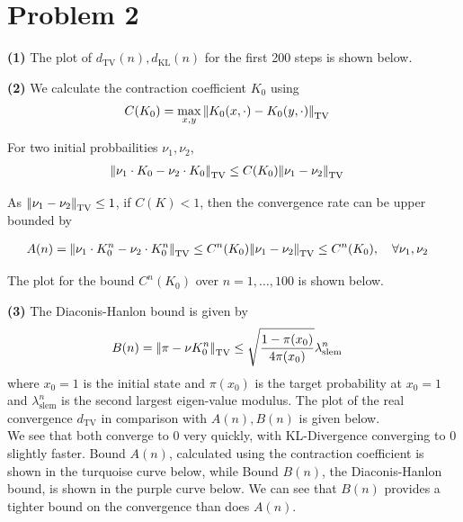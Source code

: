 \documentclass[5pt]{article}
\newcommand{\vertii}[1]{{\left\vert\kern-0.25ex\left\vert #1 
    \right\vert\kern-0.25ex\right\vert}}
\begin{document}
\section{Problem 2}

\textbf{(1)} The plot of $d_{\mathrm{TV}}(n), d_{\mathrm{KL}}(n)$ for the first 200 steps is shown below.

\textbf{(2)} We calculate the contraction coefficient $K_0$ using
\begin{align}
	& C(K_0) = \max_{x, y} \vertii{K_0(x, \cdot) - K_0(y, \cdot)}_{\mathrm{TV}}
\end{align}

For two initial probbailities $\nu_1, \nu_2$,
\begin{align}
	& \vertii{\nu_1 \cdot K_0 - \nu_2 \cdot K_0}_{\mathrm{TV}} \leq C(K_0) \vertii{\nu_1 - \nu_2}_{\mathrm{TV}}
\end{align}

As $\vertii{\nu_1 - \nu_2}_{\mathrm{TV}} \leq 1$, if $C(K) < 1$, then the convergence rate can be upper bounded by

\begin{align}
	& A(n) = \vertii{\nu_1 \cdot K_0^n - \nu_{2} \cdot K_0^n}_{\mathrm{TV}} 
	\leq C^n(K_0) \vertii{\nu_1 - \nu_2}_{\mathrm{TV}} \leq C^n(K_0), \quad \forall \nu_1, \nu_2
\end{align}

The plot for the bound $C^n(K_0)$ over $n = 1, \ldots, 100$ is shown below.

\textbf{(3)} The Diaconis-Hanlon bound is given by
\begin{align}
	& B(n) = \vertii{\pi - \nu K_0^n}_{\mathrm{TV}} \leq \sqrt{\frac{1 -\pi(x_0)}{4 \pi (x_0)}} \lambda_{\mathrm{slem}}^n
\end{align}
where $x_0 = 1$ is the initial state and $\pi(x_0)$ is the target probability at $x_0 = 1$ and $\lambda_{\mathrm{slem}}^n$ is the second largest eigen-value modulus. The plot of the real convergence $d_{\mathrm{TV}}$ in comparison with $A(n), B(n)$ is given below. \\


We see that both converge to 0 very quickly, with KL-Divergence converging to 0 slightly faster. Bound $A(n)$, calculated using the contraction coefficient is shown in the turquoise curve below, while Bound $B(n)$, the Diaconis-Hanlon bound, is shown in the purple curve below. We can see that $B(n)$ provides a tighter bound on the convergence than does $A(n)$. \\
\end{document}
